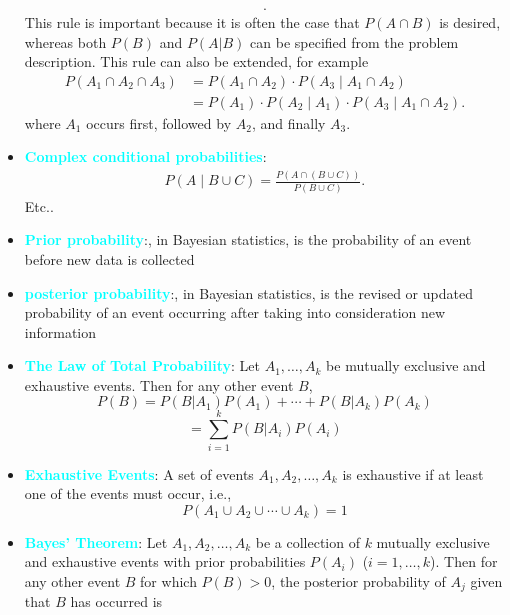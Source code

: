 \documentclass{report}
\begin{document}
\begin{itemize}
\begin{align*}
            .\end{align*}
            This rule is important because it is often the case that \( P(A \cap B) \) is desired, whereas both \( P(B) \) and \( P(A|B) \) can be specified from the problem description.
            \bigbreak \noindent 
            This rule can also be extended, for example
            \begin{align*}
                P(A_{1} \cap A_{2} \cap A_{3}) &= P(A_{1} \cap A_{2}) \cdot P(A_{3} \mid A_{1} \cap A_{2}) \\
                &=P(A_{1}) \cdot P(A_{2} \mid A_{1}) \cdot P(A_{3} \mid A_{1} \cap A_{2})
            .\end{align*}
            where $A_{1}$ occurs first, followed by $A_{2}$, and finally $A_{3}$.
        \item \textbf{\textcolor{cyan}{Complex conditional probabilities}}: 
            \begin{align*}
                P(A \mid B \cup C) = \frac{P(A\cap (B\cup C))}{P(B\cup C)}
            .\end{align*}
            Etc..
        \item \textbf{\textcolor{cyan}{Prior probability}}:, in Bayesian statistics, is the probability of an event before new data is collected
        \item \textbf{\textcolor{cyan}{posterior probability}}:, in Bayesian statistics, is the revised or updated probability of an event occurring after taking into consideration new information
        \item \textbf{\textcolor{cyan}{The Law of Total Probability}}:
            Let \( A_1, \ldots, A_k \) be mutually exclusive and exhaustive events. Then for any other event \( B \),
            \[
                P(B) = P(B|A_1)P(A_1) + \cdots + P(B|A_k)P(A_k)
            \]
            \[
                = \sum_{i=1}^{k} P(B|A_i)P(A_i) 
            \]
        \item \textbf{\textcolor{cyan}{Exhaustive Events}}: A set of events \( A_1, A_2, \ldots, A_k \) is exhaustive if at least one of the events must occur, i.e.,
            \[
                P(A_1 \cup A_2 \cup \cdots \cup A_k) = 1
            \]
        \item \textbf{\textcolor{cyan}{Bayes' Theorem}}:
            Let \( A_1, A_2, \ldots, A_k \) be a collection of \( k \) mutually exclusive and exhaustive events with prior probabilities \( P(A_i) \) (\( i = 1, \ldots, k \)). Then for any other event \( B \) for which \( P(B) > 0 \), the posterior probability of \( A_j \) given that \( B \) has occurred is

\end{itemize}
\end{document}

